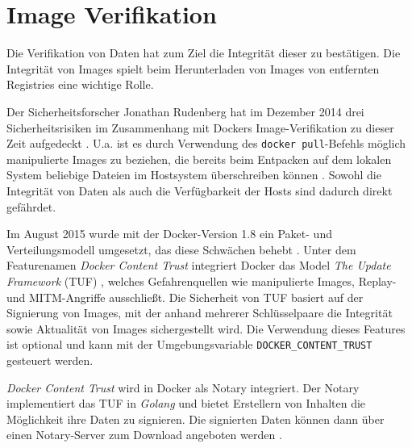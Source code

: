 \documentclass[../main.tex]{subfiles}
\begin{document}
  \section{Image Verifikation}
    Die Verifikation von Daten hat zum Ziel die Integrität dieser zu bestätigen. Die Integrität von Images spielt beim Herunterladen von Images von entfernten Registries eine wichtige Rolle.

    Der Sicherheitsforscher Jonathan Rudenberg hat im Dezember 2014 drei Sicherheitsrisiken im Zusammenhang mit Dockers Image-Verifikation zu dieser Zeit aufgedeckt \cite{githubRegistryV1Issues}\cite{registryV1IssuesRudenberg}. U.a. ist es durch Verwendung des \texttt{docker pull}-Befehls möglich manipulierte Images zu beziehen, die bereits beim Entpacken auf dem lokalen System beliebige Dateien im Hostsystem überschreiben können \cite{registryV1IssuesRedHat}. Sowohl die Integrität von Daten als auch die Verfügbarkeit der Hosts sind dadurch direkt gefährdet.

    Im August 2015 wurde mit der Docker-Version 1.8 ein Paket- und Verteilungsmodell umgesetzt, das diese Schwächen behebt \cite{dockerContentTrust}. Unter dem Featurenamen \emph{Docker Content Trust} integriert Docker das Model \emph{The Update Framework} (TUF) \cite{tufFramework}, welches Gefahrenquellen wie manipulierte Images, Replay- und MITM-Angriffe ausschließt. Die Sicherheit von TUF basiert auf der Signierung von Images, mit der anhand mehrerer Schlüsselpaare die Integrität sowie Aktualität von Images sichergestellt wird. Die Verwendung dieses Features ist optional und kann mit der Umgebungsvariable \texttt{DOCKER\_CONTENT\_TRUST} gesteuert werden.

    \emph{Docker Content Trust} wird in Docker als Notary integriert. Der Notary implementiert das TUF in \emph{Golang} und bietet Erstellern von Inhalten die Möglichkeit ihre Daten zu signieren. Die signierten Daten können dann über einen Notary-Server zum Download angeboten werden \cite{githubNotary}\cite{dockerContentTrust}.


\end{document}
